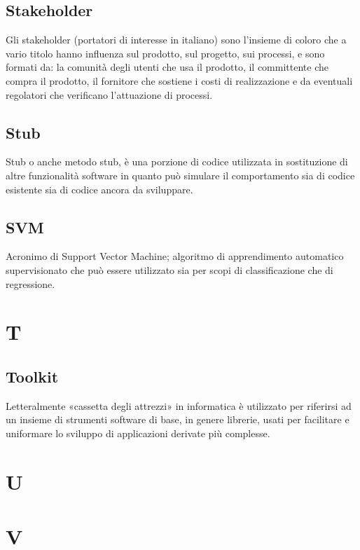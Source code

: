 \subsection*{Stakeholder}
Gli stakeholder (portatori di interesse in italiano) sono l’insieme di coloro che a vario titolo hanno influenza sul prodotto, sul progetto, sui processi, e sono formati da: la comunità degli utenti che usa il prodotto, il committente che compra il prodotto, il fornitore che sostiene i costi di realizzazione e da eventuali regolatori che verificano l’attuazione di processi.

\subsection*{Stub}
Stub o anche metodo stub, è una porzione di codice utilizzata in sostituzione di altre funzionalità software in quanto può simulare il comportamento sia di codice esistente sia di codice ancora da sviluppare.

\subsection*{SVM}
Acronimo di Support Vector Machine; algoritmo di apprendimento automatico supervisionato che può essere utilizzato sia per scopi di classificazione che di regressione.

\clearpage
\section*{T}

\subsection*{Toolkit}
Letteralmente «cassetta degli attrezzi» in informatica è utilizzato per riferirsi ad un insieme di strumenti software di base, in genere librerie, usati per facilitare e uniformare lo sviluppo di applicazioni derivate più complesse. 

\clearpage
\section*{U}

\clearpage
\section*{V}

